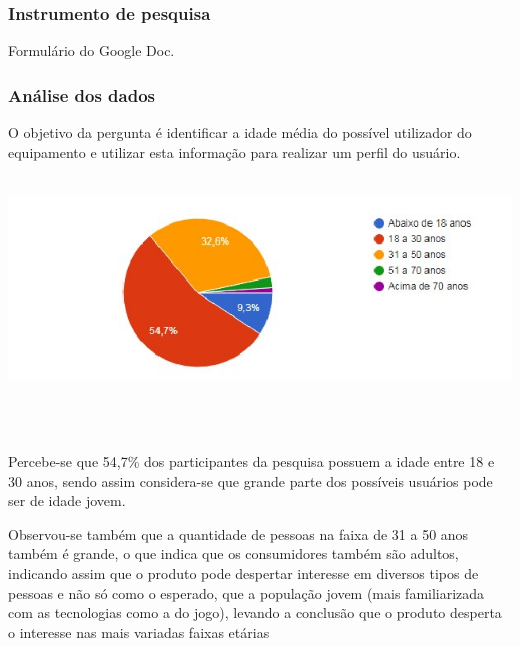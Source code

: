 \begin{apendicesenv}
\subsubsection{Instrumento de pesquisa}
 Formulário do Google Doc. 

\subsubsection{Análise dos dados}
 

O objetivo da pergunta é identificar a idade média do possível utilizador do equipamento e utilizar esta informação para realizar um perfil do usuário. 

\begin{center}
    \includegraphics[scale=0.7]{figuras/idade}
       \label{idade}
   \end{center}  
 
Percebe-se que 54,7\% dos participantes da pesquisa possuem a idade entre 18 e 30 anos, sendo assim considera-se que grande parte dos possíveis usuários pode ser de idade jovem. 

Observou-se também que a quantidade de pessoas na faixa de 31 a 50 anos também é grande, o que indica que os consumidores também são adultos, indicando assim que o produto pode despertar interesse em diversos tipos de pessoas e não só como o esperado, que a população jovem (mais familiarizada com as tecnologias como a do jogo), levando a conclusão que o produto desperta o interesse nas mais variadas faixas etárias 
 


\end{apendicesenv}
